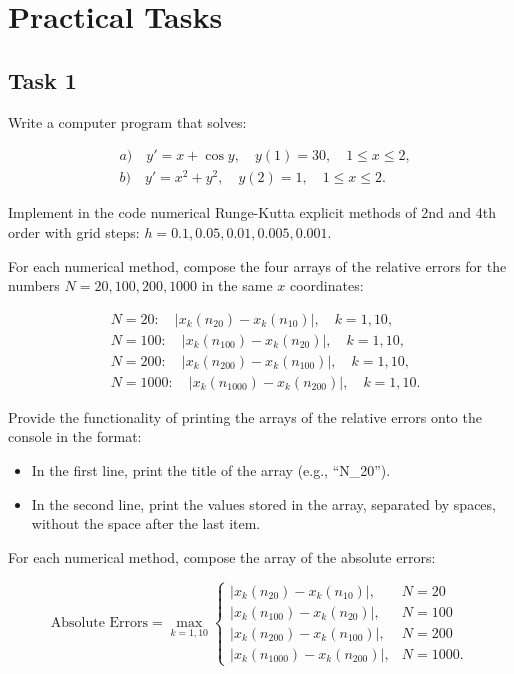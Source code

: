 \documentclass{article}
\begin{document}
\section*{Practical Tasks}

\subsection*{Task 1}

Write a computer program that solves:

\[
\begin{aligned}
    & a) \quad y' = x + \cos y, \quad y(1) = 30, \quad 1 \leq x \leq 2, \\
    & b) \quad y' = x^2 + y^2, \quad y(2) = 1, \quad 1 \leq x \leq 2.
\end{aligned}
\]

Implement in the code numerical Runge-Kutta explicit methods of 2nd and 4th order with grid steps:
\( h = 0.1, 0.05, 0.01, 0.005, 0.001 \).

For each numerical method, compose the four arrays of the relative errors for the numbers \( N = 20, 100, 200, 1000 \) in the same \( x \) coordinates:

\[
\begin{aligned}
    & N = 20: \quad |x_k(n_{20}) - x_k(n_{10})|, \quad k = 1, 10, \\
    & N = 100: \quad |x_k(n_{100}) - x_k(n_{20})|, \quad k = 1, 10, \\
    & N = 200: \quad |x_k(n_{200}) - x_k(n_{100})|, \quad k = 1, 10, \\
    & N = 1000: \quad |x_k(n_{1000}) - x_k(n_{200})|, \quad k = 1, 10.
\end{aligned}
\]

Provide the functionality of printing the arrays of the relative errors onto the console in the format:

\begin{itemize}
    \item In the first line, print the title of the array (e.g., ``N\_20'').
    \item In the second line, print the values stored in the array, separated by spaces, without the space after the last item.
\end{itemize}

For each numerical method, compose the array of the absolute errors:

\[
\text{Absolute Errors} =
\max_{k=1,10}
\begin{cases}
    |x_k(n_{20}) - x_k(n_{10})|, & N = 20 \\
    |x_k(n_{100}) - x_k(n_{20})|, & N = 100 \\
    |x_k(n_{200}) - x_k(n_{100})|, & N = 200 \\
    |x_k(n_{1000}) - x_k(n_{200})|, & N = 1000.
\end{cases}
\]
\end{document}
